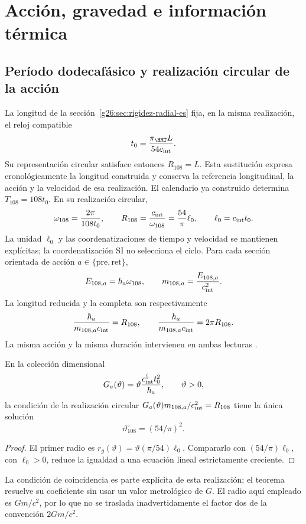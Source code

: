 \section{Acción, gravedad e información térmica}
\label{v:ant:sec:gravity}
\subsection{Período dodecafásico y realización circular de la acción}
La longitud de la sección~\ref{g26:sec:rigidez-radial-es} fija, en
la misma realización, el reloj compatible
\[
 t_0=\frac{\pi_{\HMT}L}{54c_{\rm int}}.
\]
Su representación circular satisface entonces \(R_{108}=L\). Esta
sustitución expresa cronológicamente la longitud construida y conserva
la referencia longitudinal, la acción y la velocidad de esa realización.
El calendario ya construido determina $T_{108}=108t_0$.
En su realización circular,
\[
\omega_{108}=\frac{2\pi}{108t_0},\qquad
R_{108}=\frac{c_{\rm int}}{\omega_{108}}
=\frac{54}{\pi}\ell_0,\qquad \ell_0=c_{\rm int}t_0.
\]
La unidad $\ell_0$ y las coordenatizaciones de tiempo y velocidad se mantienen
explícitas; la coordenatización SI no selecciona el ciclo.
Para cada sección orientada de acción $a\in\{\mathrm{pre},\mathrm{ret}\}$,
\[
E_{108,a}=\hbar_a\omega_{108},\qquad
m_{108,a}=\frac{E_{108,a}}{c_{\rm int}^2}.
\]
La longitud reducida y la completa son respectivamente
\[
\frac{\hbar_a}{m_{108,a}c_{\rm int}}=R_{108},
\qquad
\frac{h_a}{m_{108,a}c_{\rm int}}=2\pi R_{108}.
\]
La misma acción y la misma duración intervienen en ambas lecturas
.

\begin{proposition}
En la colección dimensional
\[
G_a(\vartheta)=\vartheta\frac{c_{\rm int}^5t_0^2}{\hbar_a},
\qquad \vartheta>0,
\]
la condición de la realización circular
$G_a(\vartheta)m_{108,a}/c_{\rm int}^2=R_{108}$
tiene la única solución
\[
\vartheta^\circ_{108}=(54/\pi)^2.
\]
\end{proposition}
\begin{proof}
El primer radio es
$r_g(\vartheta)=\vartheta(\pi/54)\ell_0$.
Compararlo con $(54/\pi)\ell_0$, con $\ell_0>0$, reduce la
igualdad a una ecuación lineal estrictamente creciente.
\end{proof}
La condición de coincidencia es parte explícita de esta realización;
el teorema resuelve su coeficiente sin usar un valor metrológico de $G$.
El radio aquí empleado es $Gm/c^2$, por lo que no se traslada
inadvertidamente el factor dos de la convención $2Gm/c^2$.

